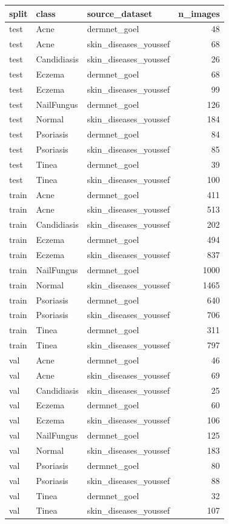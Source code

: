 \begin{tabular}{lllr}
\toprule
split & class & source\_dataset & n\_images \\
\midrule
test & Acne & dermnet\_goel & 48 \\
test & Acne & skin\_diseases\_youssef & 68 \\
test & Candidiasis & skin\_diseases\_youssef & 26 \\
test & Eczema & dermnet\_goel & 68 \\
test & Eczema & skin\_diseases\_youssef & 99 \\
test & NailFungus & dermnet\_goel & 126 \\
test & Normal & skin\_diseases\_youssef & 184 \\
test & Psoriasis & dermnet\_goel & 84 \\
test & Psoriasis & skin\_diseases\_youssef & 85 \\
test & Tinea & dermnet\_goel & 39 \\
test & Tinea & skin\_diseases\_youssef & 100 \\
train & Acne & dermnet\_goel & 411 \\
train & Acne & skin\_diseases\_youssef & 513 \\
train & Candidiasis & skin\_diseases\_youssef & 202 \\
train & Eczema & dermnet\_goel & 494 \\
train & Eczema & skin\_diseases\_youssef & 837 \\
train & NailFungus & dermnet\_goel & 1000 \\
train & Normal & skin\_diseases\_youssef & 1465 \\
train & Psoriasis & dermnet\_goel & 640 \\
train & Psoriasis & skin\_diseases\_youssef & 706 \\
train & Tinea & dermnet\_goel & 311 \\
train & Tinea & skin\_diseases\_youssef & 797 \\
val & Acne & dermnet\_goel & 46 \\
val & Acne & skin\_diseases\_youssef & 69 \\
val & Candidiasis & skin\_diseases\_youssef & 25 \\
val & Eczema & dermnet\_goel & 60 \\
val & Eczema & skin\_diseases\_youssef & 106 \\
val & NailFungus & dermnet\_goel & 125 \\
val & Normal & skin\_diseases\_youssef & 183 \\
val & Psoriasis & dermnet\_goel & 80 \\
val & Psoriasis & skin\_diseases\_youssef & 88 \\
val & Tinea & dermnet\_goel & 32 \\
val & Tinea & skin\_diseases\_youssef & 107 \\
\bottomrule
\end{tabular}
